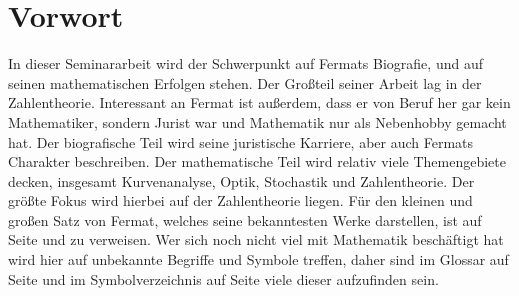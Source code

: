 \section{Vorwort}
In dieser Seminararbeit wird der Schwerpunkt auf Fermats Biografie, und auf seinen mathematischen Erfolgen stehen. Der Großteil seiner Arbeit lag in der Zahlentheorie. Interessant an Fermat ist außerdem, dass er von Beruf her gar kein Mathematiker, sondern Jurist war und Mathematik nur als Nebenhobby gemacht hat. Der biografische Teil wird seine juristische Karriere, aber auch Fermats Charakter beschreiben. Der mathematische Teil wird relativ viele Themengebiete decken, insgesamt Kurvenanalyse, Optik, Stochastik und Zahlentheorie. Der größte Fokus wird hierbei auf der Zahlentheorie liegen. Für den kleinen und großen Satz von Fermat, welches seine bekanntesten Werke darstellen, ist auf Seite \pageref{sec:klSatz} und \pageref{sec:grSatz} zu verweisen. Wer sich noch nicht viel mit Mathematik beschäftigt hat wird hier auf unbekannte Begriffe und Symbole treffen, daher sind im Glossar auf Seite \pageref{sec:glossary} und im Symbolverzeichnis auf Seite \pageref{sec:symb} viele dieser aufzufinden sein.
